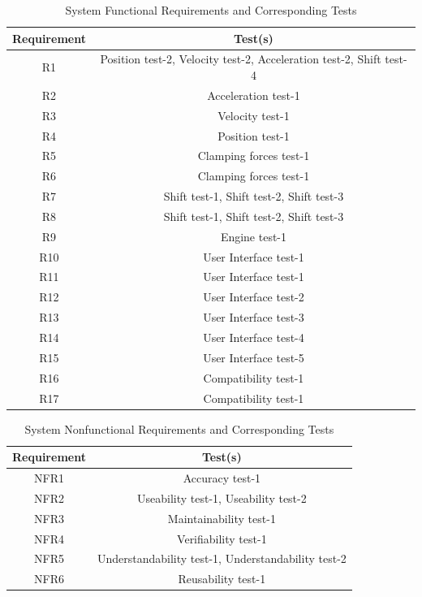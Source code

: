\documentclass[12pt, titlepage]{article}
\begin{document}
\begin{table}[H]
  \centering
    \begin{tabular}{|c|c|}
      \hline
      \textbf{Requirement} & \textbf{Test(s)} \\ \hline
      R1 & Position test-2, Velocity test-2, Acceleration test-2, Shift test-4  \\ \hline
      R2 & Acceleration test-1 \\ \hline
      R3 & Velocity test-1 \\ \hline
      R4 & Position test-1 \\ \hline
      R5 & Clamping forces test-1 \\ \hline
      R6 & Clamping forces test-1 \\ \hline
      R7 & Shift test-1, Shift test-2, Shift test-3 \\ \hline
      R8 & Shift test-1, Shift test-2, Shift test-3 \\ \hline
      R9 & Engine test-1 \\ \hline
      R10 & User Interface test-1 \\ \hline
      R11 & User Interface test-1 \\ \hline
      R12 & User Interface test-2 \\ \hline
      R13 & User Interface test-3 \\ \hline
      R14 & User Interface test-4 \\ \hline
      R15 & User Interface test-5 \\ \hline
      R16 & Compatibility test-1 \\ \hline
      R17 & Compatibility test-1 \\ \hline
      \end{tabular}
      \caption{System Functional Requirements and Corresponding Tests}
      \label{tab:requirements_tests}
  \end{table}

  \begin{table}[h!]
    \centering
      \begin{tabular}{|c|c|}
        \hline
        \textbf{Requirement} & \textbf{Test(s)} \\ \hline
        NFR1 & Accuracy test-1  \\ \hline
        NFR2 & Useability test-1, Useability test-2 \\ \hline
        NFR3 & Maintainability test-1 \\ \hline
        NFR4 & Verifiability test-1 \\ \hline
        NFR5 & Understandability test-1, Understandability test-2 \\ \hline
        NFR6 & Reusability test-1 \\ \hline
        \end{tabular}
        \caption{System Nonfunctional Requirements and Corresponding Tests}
        \label{tab:requirements_tests}
    \end{table}
		
\end{document}
